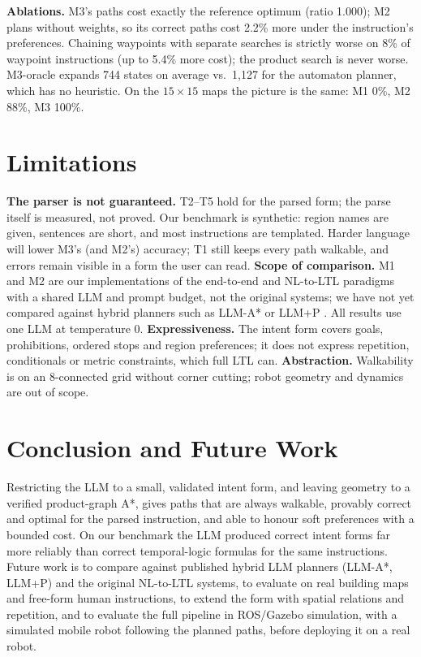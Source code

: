 \documentclass[letterpaper, 10 pt, conference]{ieeeconf}
\begin{document}
\textbf{Ablations.} M3's paths cost exactly the reference optimum (ratio 1.000); M2
plans without weights, so its correct paths cost 2.2\% more under the instruction's
preferences. Chaining waypoints with separate searches is strictly worse on 8\% of
waypoint instructions (up to 5.4\% more cost); the product search is never worse.
M3-oracle expands 744 states on average vs.\ 1{,}127 for the automaton planner, which
has no heuristic. On the $15\times15$ maps the picture is the same: M1 0\%, M2 88\%,
M3 100\%.

\section{Limitations}

\textbf{The parser is not guaranteed.} T2--T5 hold for the parsed form; the parse
itself is measured, not proved. Our benchmark is synthetic: region names are given,
sentences are short, and most instructions are templated. Harder language will lower
M3's (and M2's) accuracy; T1 still keeps every path walkable, and errors remain visible
in a form the user can read.
\textbf{Scope of comparison.} M1 and M2 are our implementations of the
end-to-end and NL-to-LTL paradigms with a shared LLM and prompt budget, not the
original systems; we have not yet compared against hybrid planners such as LLM-A*
\cite{meng2024llmastar} or LLM+P \cite{liu2023llmp}. All results use one LLM at
temperature 0.
\textbf{Expressiveness.} The intent form covers goals, prohibitions, ordered stops and
region preferences; it does not express repetition, conditionals or metric
constraints, which full LTL can. \textbf{Abstraction.} Walkability is on an
8-connected grid without corner cutting; robot geometry and dynamics are out of scope.

\section{Conclusion and Future Work}

Restricting the LLM to a small, validated intent form, and leaving geometry to a
verified product-graph A*, gives paths that are always walkable, provably correct
and optimal for the parsed instruction, and able to honour soft preferences with a
bounded cost. On our benchmark the LLM produced correct intent forms far more
reliably than correct temporal-logic formulas for the same instructions. Future work
is to compare against published hybrid LLM planners (LLM-A*, LLM+P) and the original
NL-to-LTL systems, to evaluate on real building maps and free-form human instructions,
to extend the form with spatial relations and repetition, and to evaluate the full
pipeline in ROS/Gazebo simulation, with a simulated mobile robot following the planned
paths, before deploying it on a real robot.
\end{document}
